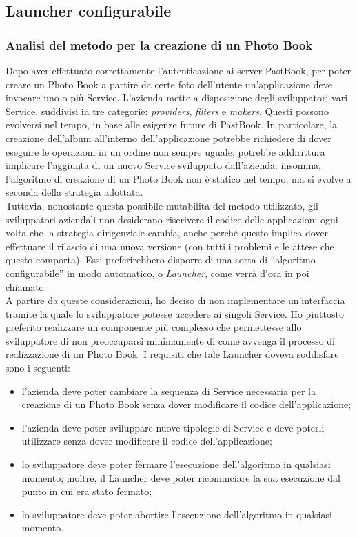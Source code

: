 		\subsection{Launcher configurabile}
			\subsubsection{Analisi del metodo per la creazione di un Photo Book}
				Dopo aver effettuato correttamente l'autenticazione ai server PastBook, per poter creare un Photo Book a partire da
				certe foto dell'utente un'applicazione deve invocare uno o più Service. L'azienda mette a disposizione degli
				sviluppatori vari Service, suddivisi in tre categorie: \emph{providers}, \emph{filters} e \emph{makers}. Questi
				possono evolversi nel tempo, in base alle esigenze future di PastBook. In particolare, la creazione dell'album
				all'interno dell'applicazione potrebbe richiedere di dover eseguire le operazioni in un ordine non sempre uguale;
				potrebbe addirittura implicare l'aggiunta di un nuovo Service sviluppato dall'azienda: insomma, l'algoritmo di
				creazione di un Photo Book non è statico nel tempo, ma si evolve a seconda della strategia adottata.\\
				Tuttavia, nonostante questa possibile mutabilità del metodo utilizzato, gli sviluppatori aziendali non desiderano
				riscrivere il codice delle applicazioni ogni volta che la strategia dirigenziale cambia, anche perché questo implica
				dover effettuare il rilascio di una nuova versione (con tutti i problemi e le attese che questo comporta). Essi
				preferirebbero disporre di una sorta di “algoritmo configurabile” in modo automatico, o \emph{Launcher}, come verrà
				d'ora in poi chiamato.\\
				A partire da queste considerazioni, ho deciso di non implementare un'interfaccia tramite la quale lo sviluppatore
				potesse accedere ai singoli Service. Ho piuttosto preferito realizzare un componente più complesso che permettesse
				allo sviluppatore di non preoccuparsi minimamente di come avvenga il processo di realizzazione di un Photo Book. I
				requisiti che tale Launcher doveva soddisfare sono i seguenti:
				\begin{itemize}
					\item l'azienda deve poter cambiare la sequenza di Service necessaria per la creazione di un Photo Book
					senza dover modificare il codice dell'applicazione;
					\item l'azienda deve poter sviluppare nuove tipologie di Service e deve poterli utilizzare senza dover
					modificare il codice dell'applicazione;
					\item lo sviluppatore deve poter fermare l'esecuzione dell'algoritmo in qualsiasi momento; inoltre, il
					Launcher deve poter ricominciare la sua esecuzione dal punto in cui era stato fermato;
					\item lo sviluppatore deve poter abortire l'esecuzione dell'algoritmo in qualsiasi momento.
				\end{itemize}
